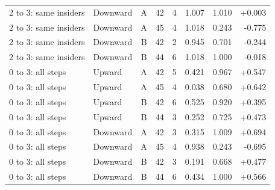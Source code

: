 \begin{longtable}{p{3.3cm}lrrrrrr}
2 to 3: same insiders & Downward & A & 42 & 4 & 1.007 & 1.010 & +0.003 \\
2 to 3: same insiders & Downward & A & 45 & 4 & 1.018 & 0.243 & -0.775 \\
2 to 3: same insiders & Downward & B & 42 & 2 & 0.945 & 0.701 & -0.244 \\
2 to 3: same insiders & Downward & B & 44 & 6 & 1.018 & 1.000 & -0.018 \\
0 to 3: all steps & Upward & A & 42 & 5 & 0.421 & 0.967 & +0.547 \\
0 to 3: all steps & Upward & A & 45 & 4 & 0.038 & 0.680 & +0.642 \\
0 to 3: all steps & Upward & B & 42 & 6 & 0.525 & 0.920 & +0.395 \\
0 to 3: all steps & Upward & B & 44 & 3 & 0.252 & 0.725 & +0.473 \\
0 to 3: all steps & Downward & A & 42 & 3 & 0.315 & 1.009 & +0.694 \\
0 to 3: all steps & Downward & A & 45 & 4 & 0.938 & 0.243 & -0.695 \\
0 to 3: all steps & Downward & B & 42 & 3 & 0.191 & 0.668 & +0.477 \\
0 to 3: all steps & Downward & B & 44 & 6 & 0.434 & 1.000 & +0.566 \\
\end{longtable}
